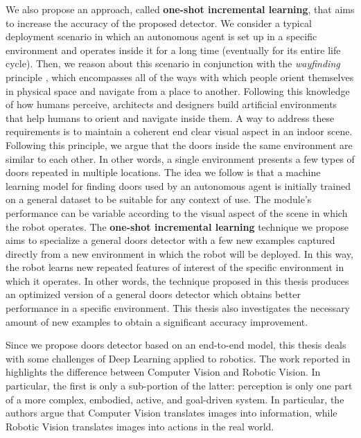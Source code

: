 We also propose an approach, called \textbf{one-shot incremental learning}, that aims to increase the accuracy of the proposed detector. We consider a typical deployment scenario in which an autonomous agent is set up in a specific environment and operates inside it for a long time (eventually for its entire life cycle). Then, we reason about this scenario in  conjunction with the \textit{wayfinding} principle \cite{wayfinding, imageofcity}, which encompasses all of the ways with which people orient themselves in physical space and navigate from a place to another. Following this knowledge of how humans perceive, architects and designers build artificial environments that help humans to orient and navigate inside them. A way to address these requirements is to maintain a coherent end clear visual aspect in an indoor scene. Following this principle, we argue that the doors inside the same environment are similar to each other. In other words, a single environment presents a few types of doors repeated in multiple locations. The idea we follow is that a machine learning model for finding doors used by an autonomous agent is initially trained on a general dataset to be suitable for any context of use. The module's performance can be variable according to the visual aspect of the scene in which the robot operates. The \textbf{one-shot incremental learning} technique we propose aims to specialize a general doors detector with a few new examples captured directly from a new environment in which the robot will be deployed. In this way, the robot learns new  repeated features of interest of the specific environment in which it operates. 
 In other words, the technique proposed in this thesis produces an optimized version of a general doors detector which obtains better performance in a specific environment. This thesis also investigates the necessary amount of new examples to obtain a significant accuracy improvement.

Since we propose doors detector based on an end-to-end model, this thesis deals with some challenges of Deep Learning applied to robotics. The work reported in \cite{surveydeeplimits} highlights the difference between Computer Vision and Robotic Vision. In particular, the first is only a sub-portion of the latter: perception is only one part of a more complex, embodied, active, and goal-driven system. In particular, the authors argue that Computer Vision translates images into information, while Robotic Vision translates images into actions in the real world.

